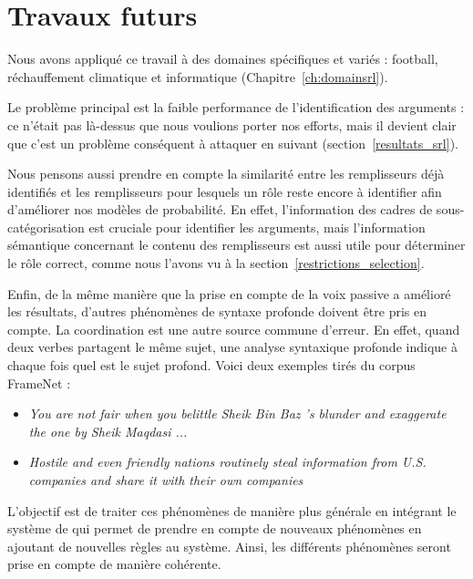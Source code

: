 \section{Travaux futurs}

Nous avons appliqué ce travail à des domaines spécifiques et variés : football,
réchauffement climatique et informatique (Chapitre~\ref{ch:domainsrl}).

Le problème principal est la faible performance de l'identification des
arguments : ce n'était pas là-dessus que nous voulions porter nos efforts, mais
il devient clair que c'est un problème conséquent à attaquer en suivant
(section~\ref{resultats_srl}).

Nous pensons aussi prendre en compte la similarité entre les remplisseurs déjà
identifiés et les remplisseurs pour lesquels un rôle reste encore à identifier
afin d'améliorer nos modèles de probabilité. En effet, l'information des cadres
de sous-catégorisation est cruciale pour identifier les arguments, mais
l'information sémantique concernant le contenu des remplisseurs est aussi utile
pour déterminer le rôle correct, comme nous l'avons vu à la
section~\ref{restrictions_selection}.

Enfin, de la même manière que la prise en compte de la voix passive a amélioré
les résultats, d'autres phénomènes de syntaxe profonde doivent être pris en
compte. La coordination est une autre source commune d'erreur. En effet, quand
deux verbes partagent le même sujet, une analyse syntaxique profonde indique à
chaque fois quel est le sujet profond. Voici deux exemples tirés du corpus
FrameNet :

\begin{itemize}

    \item \textit{You are not fair when you belittle Sheik Bin Baz 's blunder and
        exaggerate the one by Sheik Maqdasi ...}

    \item \textit{Hostile and even friendly nations routinely steal information
        from U.S. companies and share it with their own companies}

\end{itemize}

L'objectif est de traiter ces phénomènes de manière plus générale en intégrant
le système de \cite{ribeyre2013systeme} qui permet de prendre en compte de
nouveaux phénomènes en ajoutant de nouvelles règles au système. Ainsi, les
différents phénomènes seront prise en compte de manière cohérente.

